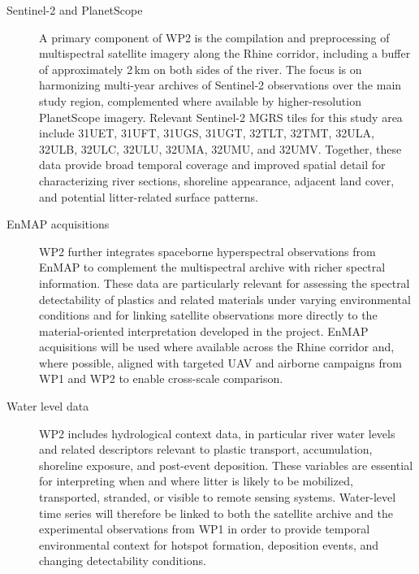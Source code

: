 \documentclass{scrartcl}
\begin{document}
\begin{description}
    \item[Sentinel-2 and PlanetScope] A primary component of WP2 is the compilation and preprocessing of multispectral satellite imagery along the Rhine corridor, including a buffer of approximately 2\,km on both sides of the river. The focus is on harmonizing multi-year archives of Sentinel-2 observations over the main study region, complemented where available by higher-resolution PlanetScope imagery. Relevant Sentinel-2 MGRS tiles for this study area include 31UET, 31UFT, 31UGS, 31UGT, 32TLT, 32TMT, 32ULA, 32ULB, 32ULC, 32ULU, 32UMA, 32UMU, and 32UMV. Together, these data provide broad temporal coverage and improved spatial detail for characterizing river sections, shoreline appearance, adjacent land cover, and potential litter-related surface patterns. 

    \item[EnMAP acquisitions] WP2 further integrates spaceborne hyperspectral observations from EnMAP to complement the multispectral archive with richer spectral information. These data are particularly relevant for assessing the spectral detectability of plastics and related materials under varying environmental conditions and for linking satellite observations more directly to the material-oriented interpretation developed in the project. EnMAP acquisitions will be used where available across the Rhine corridor and, where possible, aligned with targeted UAV and airborne campaigns from WP1 and WP2 to enable cross-scale comparison. 

    \item[Water level data] WP2 includes hydrological context data, in particular river water levels and related descriptors relevant to plastic transport, accumulation, shoreline exposure, and post-event deposition. These variables are essential for interpreting when and where litter is likely to be mobilized, transported, stranded, or visible to remote sensing systems. Water-level time series will therefore be linked to both the satellite archive and the experimental observations from WP1 in order to provide temporal environmental context for hotspot formation, deposition events, and changing detectability conditions. 


\end{description}
\end{document}
